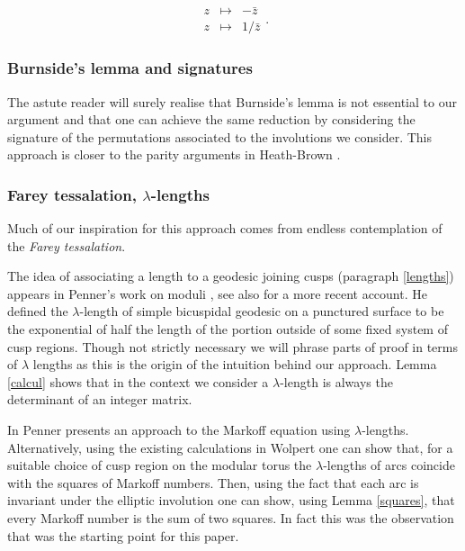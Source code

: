 \documentclass[12pt,a4paper]{amsart}
\begin{document}
$$
\begin{array}{lll} z &\mapsto& -\bar{z} \\ z &\mapsto& 1/\bar{z}
\end{array}. $$



\subsubsection{Burnside's lemma and signatures}
 The astute reader will surely realise that Burnside's lemma is not essential to our argument
 and that one can achieve the same reduction by considering the signature
 of the permutations associated to the  involutions we consider. 
 This approach is closer to the parity arguments in Heath-Brown \cite{heath}.
 
 \subsubsection{Farey tessalation, $\lambda$-lengths}

 Much of our inspiration for this approach comes from  endless
 contemplation of the \textit{Farey tessalation}.
 
 The idea of associating a length to a geodesic joining cusps
 (paragraph \ref{lengths}) appears in Penner's work on moduli
 \cite{bob},
see also \cite{spring} for a more recent account.
He defined the $\lambda$-length of simple bicuspidal geodesic 
on a punctured
surface to be the exponential of half the 
length of the portion outside of some fixed
system of cusp regions.
Though not strictly necessary 
we will phrase parts of proof in terms of $\lambda$ lengths
as this is the origin of the  intuition behind our approach. 
Lemma \ref{calcul} shows that in the context we consider
a $\lambda$-length is always the determinant 
of an integer matrix.

In \cite{bob} Penner presents an approach to the Markoff equation
using $\lambda$-lengths. Alternatively,  using the existing calculations in
Wolpert \cite{saw} one can show that, for a suitable choice of cusp
region on the modular torus  the $\lambda$-lengths of arcs coincide
with the squares of Markoff numbers. Then, using the fact that each
arc is invariant under the elliptic involution one can show, using
Lemma \ref{squares}, that every Markoff number is the sum of two
squares. In fact this was the observation that was the starting
point for this paper.
 
\end{document}
